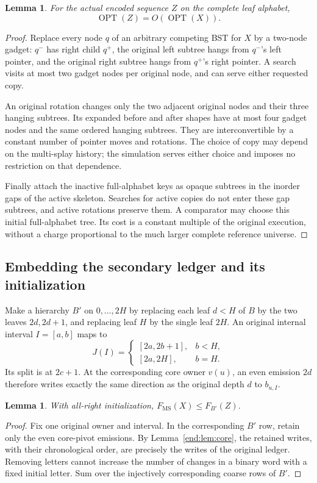 \documentclass[11pt]{article}
\numberwithin{equation}{section}
\newtheorem{lemma}[theorem]{Lemma}
\newcommand{\OPT}{\operatorname{OPT}}
\newcommand{\MS}{\mathrm{MS}}
\begin{document}
\begin{lemma}\label{end:lem:competitor}
For the actual encoded sequence $Z$ on the complete leaf alphabet,
\[
 \OPT(Z)=O(\OPT(X)).
\]
\end{lemma}
\begin{proof}
Replace every node $q$ of an arbitrary competing BST for $X$ by a
two-node gadget: $q^-$ has right child $q^+$, the original left subtree
hangs from $q^-$'s left pointer, and the original right subtree hangs
from $q^+$'s right pointer. A search visits at most two gadget nodes per
original node, and can serve either requested copy.

An original rotation changes only the two adjacent original nodes and
their three hanging subtrees. Its expanded before and after shapes have
at most four gadget nodes and the same ordered hanging subtrees. They
are interconvertible by a constant number of pointer moves and rotations.
The choice of copy may depend on the multi-splay history; the simulation
serves either choice and imposes no restriction on that dependence.

Finally attach the inactive full-alphabet keys as opaque subtrees in
the inorder gaps of the active skeleton. Searches for active copies do
not enter these gap subtrees, and active rotations preserve them. A
comparator may choose this initial full-alphabet tree. Its cost is a
constant multiple of the original execution, without a charge
proportional to the much larger complete reference universe.
\end{proof}

\subsection{Embedding the secondary ledger and its initialization}

Make a hierarchy $B'$ on $0,\ldots,2H$ by replacing each leaf $d<H$
of $B$ by the two leaves $2d,2d+1$, and replacing leaf $H$ by the
single leaf $2H$. An original internal interval $I=[a,b]$ maps to
\[
 J(I)=
 \begin{cases}
 [2a,2b+1],&b<H,\\
 [2a,2H],&b=H.
 \end{cases}
\]
Its split is at $2c+1$. At the corresponding core owner $v(u)$,
an even emission $2d$ therefore writes exactly the same direction as
the original depth $d$ to $b_{u,I}$.

\begin{lemma}\label{end:lem:subsequence}
With all-right initialization, $F_{\MS}(X)\le F_{B'}(Z)$.
\end{lemma}
\begin{proof}
Fix one original owner and interval. In the corresponding $B'$ row,
retain only the even core-pivot emissions. By Lemma~\ref{end:lem:core},
the retained writes, with their chronological order, are precisely the
writes of the original ledger. Removing letters cannot increase the
number of changes in a binary word with a fixed initial letter. Sum
over the injectively corresponding coarse rows of $B'$.
\end{proof}
\end{document}
